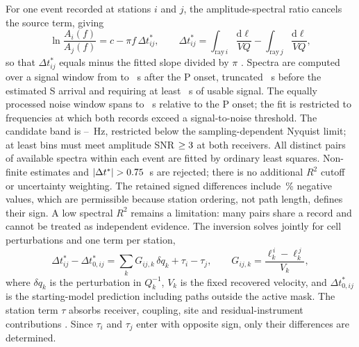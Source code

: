 \documentclass[review,authoryear,longtitle]{elsarticle}
\begin{document}
For one event recorded at stations $i$ and $j$, the amplitude-spectral
ratio cancels the source term, giving
%
\begin{equation}
  \ln \frac{A_i(f)}{A_j(f)} = c - \pi f \, \Delta t^{*}_{ij},
  \qquad
  \Delta t^{*}_{ij} = \int_{\mathrm{ray}\,i}\!\frac{\mathrm{d}\ell}{V\!Q}
                    - \int_{\mathrm{ray}\,j}\!\frac{\mathrm{d}\ell}{V\!Q},
  \label{eq:tstar}
\end{equation}
%
so that $\Delta t^{*}_{ij}$ equals minus the fitted slope divided by $\pi$ \citep{AndersonHough1984,QuanHarris1997}. Spectra are computed
over a signal window from \inicioSenal{} to \finSenal~s after
the P onset, truncated \margenS~s before the estimated S arrival
and requiring at least \minSenal~s of usable signal. The equally
processed noise window spans \inicioRuido{} to \finRuido~s relative
to the P onset;
the fit is restricted to frequencies at which both records exceed a
signal-to-noise threshold. The candidate band is \freqMin--\freqMax~Hz,
restricted below the sampling-dependent Nyquist limit; at least
\minFrecuencias{} bins must meet amplitude SNR $\ge3$ at both
receivers. All distinct pairs of available spectra within each event are
fitted by ordinary least squares. Non-finite estimates and
$|\Delta t^*|>\maxDelta$~s are rejected; there is no additional $R^2$
cutoff or uncertainty weighting. The retained signed differences include
\fracDeltaNegativo\,\% negative values, which are permissible because
station ordering, not path length, defines their sign. A low spectral
$R^2$ remains a limitation: many pairs share a record and cannot be treated
as independent evidence. The inversion solves jointly for cell
perturbations and one term per station,
%
\begin{equation}
  \Delta t^{*}_{ij}-\Delta t^{*}_{0,ij}
  = \sum_k G_{ij,k}\,\delta q_k + \tau_i - \tau_j ,
  \qquad G_{ij,k}=\frac{\ell^{\,i}_k-\ell^{\,j}_k}{V_k},
  \label{eq:qinv}
\end{equation}
%
where $\delta q_k$ is the perturbation in $Q_k^{-1}$, $V_k$ is the
fixed recovered velocity, and $\Delta t^*_{0,ij}$ is the starting-model
prediction including paths outside the active mask. The station term
$\tau$ absorbs receiver, coupling, site and residual-instrument
contributions \citep{EberhartPhillipsChadwick2002}. Since $\tau_i$ and
$\tau_j$ enter with opposite sign, only their differences are determined.
\end{document}
